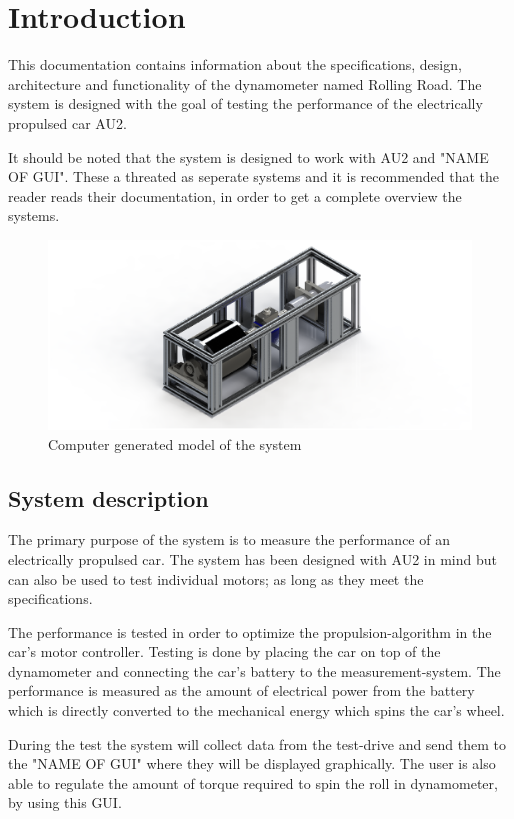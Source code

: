 \chapter{Introduction}
This documentation contains information about the specifications, design, architecture and functionality of the dynamometer named Rolling Road. The system is designed with the goal of testing the performance of the electrically propulsed car AU2.

It should be noted that the system is designed to work with AU2 and "NAME OF GUI". These a threated as seperate systems and it is recommended that the reader reads their documentation, in order to get a complete overview the systems.

\begin{figure}[H]
	\centering
	\includegraphics[width=0.5\linewidth]{Introduction/Model}
	\caption{Computer generated model of the system}
	\label{fig:System_model}
\end{figure}

\section{System description}
The primary purpose of the system is to measure the performance of an electrically propulsed car. The system has been designed with AU2 in mind but can also be used to test individual motors; as long as they meet the specifications.

The performance is tested in order to optimize the propulsion-algorithm in the car's motor controller. Testing is done by placing the car on top of the dynamometer and connecting the car's battery to the measurement-system. The performance is measured as the amount of electrical power from the battery which is directly converted to the mechanical energy which spins the car's wheel.

During the test the system will collect data from the test-drive and send them to the "NAME OF GUI" where they will be displayed graphically. The user is also able to regulate the amount of torque required to spin the roll in dynamometer, by using this GUI.

